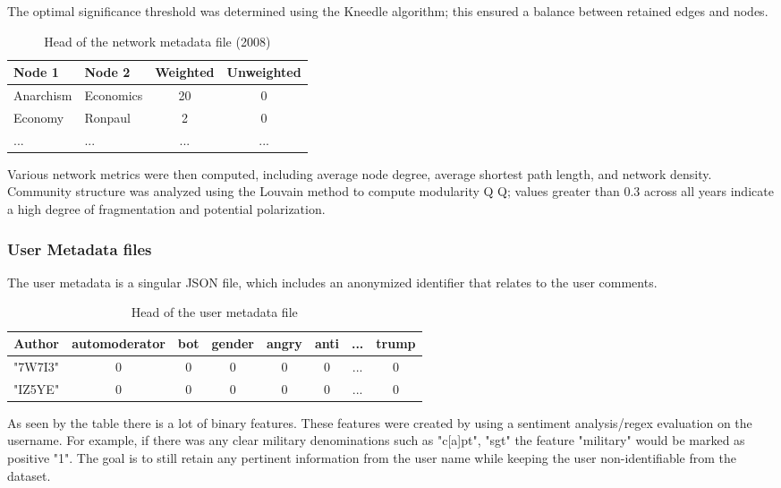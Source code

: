 \documentclass{article}
\begin{document}
The optimal significance threshold was determined using the Kneedle algorithm\cite{kneedle}; this ensured a balance between retained edges and nodes. 

\begin{table}[h]
\centering
\begin{tabular}[]{llcc}
\hline
Node 1 & Node 2 & Weighted &Unweighted\\
\hline
Anarchism & Economics & 20       & 0          \\
Economy   & Ronpaul   & 2        & 0          \\
...       & ...       & ...      & ...          \\
\hline
\end{tabular}
\vspace{10pt}
\caption{Head of the network metadata file (2008)}
\end{table}%


Various network metrics were then computed, including average node degree, average shortest path length, and network density. Community structure was analyzed using the Louvain method to compute modularity 
Q
Q; values greater than 0.3 across all years indicate a high degree of fragmentation and potential polarization.


\subsubsection{User Metadata files}

The user metadata is a singular JSON file, which includes an anonymized identifier that relates to the user comments.

\begin{table}[h]
\centering
\begin{tabular}[]{cccccccc}
\hline
Author & automoderator & bot & gender & angry & anti & ... & trump\\
\hline
"7W7I3"   &   0   &   0   &   0   &   0   &   0   &   ... &   0   \\
"IZ5YE"   &   0   &   0   &   0   &   0   &   0   &   ... &   0   \\
\hline
\end{tabular}
\vspace{10pt}
\caption{Head of the user metadata file}
\end{table}%

As seen by the table there is a lot of binary features. These features were created by using a sentiment analysis/regex evaluation on the username. For example, if there was any clear military denominations such as "c[a]pt", "sgt" the feature "military" would be marked as positive "1". The goal is to still retain any pertinent information from the user name while keeping the user non-identifiable from the dataset.
\end{document}
